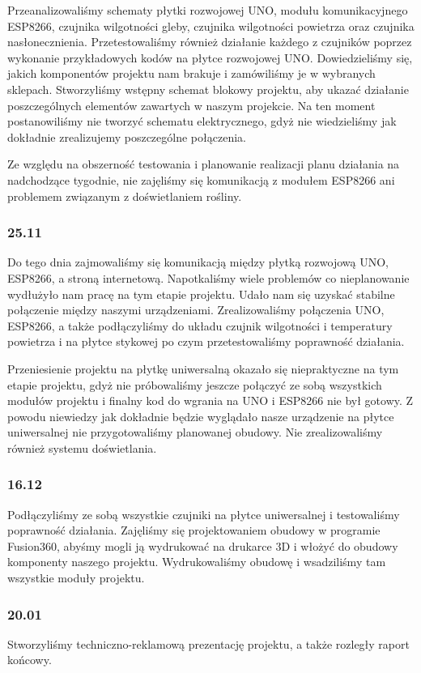 \documentclass[12pt]{article}
\begin{document}
Przeanalizowaliśmy schematy płytki rozwojowej UNO, modułu komunikacyjnego ESP8266, czujnika wilgotności gleby, czujnika wilgotności powietrza oraz czujnika nasłonecznienia. Przetestowaliśmy również działanie każdego z czujników poprzez wykonanie przykładowych kodów na płytce rozwojowej UNO. Dowiedzieliśmy się, jakich komponentów projektu nam brakuje i zamówiliśmy je w wybranych sklepach.
Stworzyliśmy wstępny schemat blokowy projektu, aby ukazać działanie poszczególnych elementów zawartych w naszym projekcie. Na ten moment postanowiliśmy nie tworzyć schematu elektrycznego, gdyż nie wiedzieliśmy jak dokładnie zrealizujemy poszczególne połączenia.

Ze względu na obszerność testowania i planowanie realizacji planu działania na nadchodzące tygodnie, nie zajęliśmy się komunikacją z modułem ESP8266  ani problemem związanym z doświetlaniem rośliny.


\subsubsection{25.11}
Do tego dnia zajmowaliśmy się komunikacją między płytką rozwojową UNO, ESP8266, a stroną internetową. Napotkaliśmy wiele problemów co nieplanowanie wydłużyło nam pracę na tym etapie projektu. Udało nam się uzyskać stabilne połączenie między naszymi urządzeniami. Zrealizowaliśmy połączenia UNO, ESP8266, a także podłączyliśmy do układu czujnik wilgotności i temperatury powietrza i na płytce stykowej po czym przetestowaliśmy poprawność działania. 

Przeniesienie projektu na płytkę uniwersalną okazało się niepraktyczne na tym etapie projektu, gdyż nie próbowaliśmy jeszcze połączyć ze sobą wszystkich modułów projektu i finalny kod do wgrania na UNO i ESP8266 nie był gotowy. Z powodu niewiedzy jak dokładnie będzie wyglądało nasze urządzenie na płytce uniwersalnej nie przygotowaliśmy planowanej obudowy. Nie zrealizowaliśmy również systemu doświetlania.

\subsubsection{16.12}
Podłączyliśmy ze sobą wszystkie czujniki na płytce uniwersalnej i testowaliśmy poprawność działania. Zajęliśmy się projektowaniem obudowy w programie Fusion360, abyśmy mogli ją wydrukować na drukarce 3D i włożyć do obudowy komponenty naszego projektu. Wydrukowaliśmy obudowę i wsadziliśmy tam wszystkie moduły projektu.

\subsubsection{20.01}
Stworzyliśmy techniczno-reklamową prezentację projektu, a także rozległy raport końcowy. 
\end{document}
